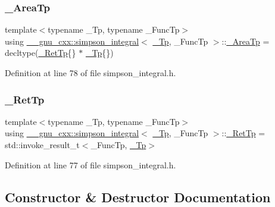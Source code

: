 \subsubsection{\texorpdfstring{\+\_\+\+Area\+Tp}{\_AreaTp}}
{\footnotesize\ttfamily template$<$typename \+\_\+\+Tp, typename \+\_\+\+Func\+Tp$>$ \\
using \hyperlink{class____gnu__cxx_1_1simpson__integral}{\+\_\+\+\_\+gnu\+\_\+cxx\+::simpson\+\_\+integral}$<$ \hyperlink{namespace____gnu__cxx_a3b19a9c800ca194374ef9172290f7d79}{\+\_\+\+Tp}, \+\_\+\+Func\+Tp $>$\+::\hyperlink{class____gnu__cxx_1_1simpson__integral_a4d84c87903e8359f4a617e08703c15a1}{\+\_\+\+Area\+Tp} =  decltype(\hyperlink{class____gnu__cxx_1_1simpson__integral_a251aaa10ebf0fc261b0ca2f7fc8ed939}{\+\_\+\+Ret\+Tp}\{\} $\ast$ \hyperlink{namespace____gnu__cxx_a3b19a9c800ca194374ef9172290f7d79}{\+\_\+\+Tp}\{\})}



Definition at line 78 of file simpson\+\_\+integral.\+h.

\mbox{\label{class____gnu__cxx_1_1simpson__integral_a251aaa10ebf0fc261b0ca2f7fc8ed939}} 
\subsubsection{\texorpdfstring{\+\_\+\+Ret\+Tp}{\_RetTp}}
{\footnotesize\ttfamily template$<$typename \+\_\+\+Tp, typename \+\_\+\+Func\+Tp$>$ \\
using \hyperlink{class____gnu__cxx_1_1simpson__integral}{\+\_\+\+\_\+gnu\+\_\+cxx\+::simpson\+\_\+integral}$<$ \hyperlink{namespace____gnu__cxx_a3b19a9c800ca194374ef9172290f7d79}{\+\_\+\+Tp}, \+\_\+\+Func\+Tp $>$\+::\hyperlink{class____gnu__cxx_1_1simpson__integral_a251aaa10ebf0fc261b0ca2f7fc8ed939}{\+\_\+\+Ret\+Tp} =  std\+::invoke\+\_\+result\+\_\+t$<$\+\_\+\+Func\+Tp, \hyperlink{namespace____gnu__cxx_a3b19a9c800ca194374ef9172290f7d79}{\+\_\+\+Tp}$>$}



Definition at line 77 of file simpson\+\_\+integral.\+h.



\subsection{Constructor \& Destructor Documentation}
\mbox{\label{class____gnu__cxx_1_1simpson__integral_aa94bd76eec39db81dd8da7c56ed2f4fe}} 
